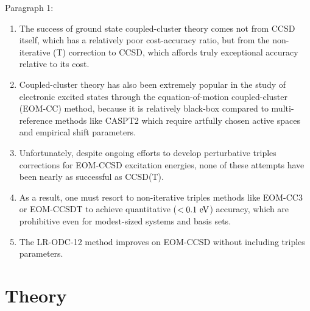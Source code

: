 Paragraph 1:
\begin{enumerate}
    \item
        The success of ground state coupled-cluster theory comes not from CCSD
        itself, which has a relatively poor cost-accuracy ratio, but from the
        non-iterative (T) correction to CCSD, which affords truly exceptional
        accuracy relative to its cost.\cite{Stanton:1997p130}
    \item
        Coupled-cluster theory has also been extremely popular in the study of
        electronic excited states through the equation-of-motion coupled-cluster
        (EOM-CC) method,\cite{Krylov:2008p433} because it is relatively
        black-box compared to multi-reference methods like
        CASPT2\cite{Andersson:1992p1218} which require artfully chosen active
        spaces and empirical shift parameters.\cite{Zobel:2017p1482}
    \item
        Unfortunately, despite ongoing efforts to develop perturbative triples
        corrections for EOM-CCSD excitation energies, none of these attempts
        have been nearly as successful as CCSD(T).\cite{Matthews:2016p124102}
    \item
        As a result, one must resort to non-iterative triples methods like
        EOM-CC3\cite{Koch:1998p1808} or EOM-CCSDT\cite{Hirata:2000p255} to
        achieve quantitative (\(<0.1~\mathrm{eV}\)) accuracy, which are prohibitive even
        for modest-sized systems and basis sets.
    \item
        The LR-ODC-12 method improves on EOM-CCSD without including triples
        parameters.
\end{enumerate}


\section{Theory}

